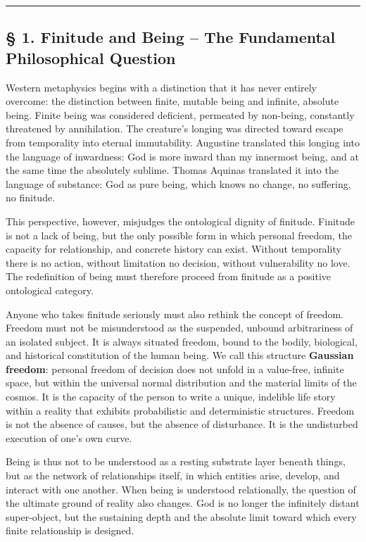 \documentclass[
  english,
]{article}
\begin{document}
\begin{center}\rule{0.5\linewidth}{0.5pt}\end{center}

\subsection{§ 1. Finitude and Being -- The Fundamental Philosophical
Question}\label{finitude-and-being-the-fundamental-philosophical-question}

Western metaphysics begins with a distinction that it has never entirely
overcome: the distinction between finite, mutable being and infinite,
absolute being. Finite being was considered deficient, permeated by
non-being, constantly threatened by annihilation. The creature's longing
was directed toward escape from temporality into eternal immutability.
Augustine translated this longing into the language of inwardness: God
is more inward than my innermost being, and at the same time the
absolutely sublime. Thomas Aquinas translated it into the language of
substance: God as pure being, which knows no change, no suffering, no
finitude.

This perspective, however, misjudges the ontological dignity of
finitude. Finitude is not a lack of being, but the only possible form in
which personal freedom, the capacity for relationship, and concrete
history can exist. Without temporality there is no action, without
limitation no decision, without vulnerability no love. The redefinition
of being must therefore proceed from finitude as a positive ontological
category.

Anyone who takes finitude seriously must also rethink the concept of
freedom. Freedom must not be misunderstood as the suspended, unbound
arbitrariness of an isolated subject. It is always situated freedom,
bound to the bodily, biological, and historical constitution of the
human being. We call this structure \textbf{Gaussian freedom}: personal
freedom of decision does not unfold in a value-free, infinite space, but
within the universal normal distribution and the material limits of the
cosmos. It is the capacity of the person to write a unique, indelible
life story within a reality that exhibits probabilistic and
deterministic structures. Freedom is not the absence of causes, but the
absence of disturbance. It is the undisturbed execution of one's own
curve.

Being is thus not to be understood as a resting substrate layer beneath
things, but as the network of relationships itself, in which entities
arise, develop, and interact with one another. When being is understood
relationally, the question of the ultimate ground of reality also
changes. God is no longer the infinitely distant super-object, but the
sustaining depth and the absolute limit toward which every finite
relationship is designed.
\end{document}
